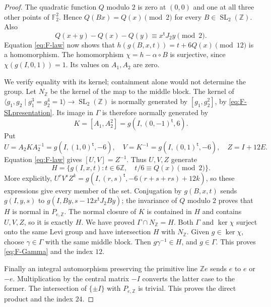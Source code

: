\begin{proof}
The quadratic function $Q$ modulo $2$ is zero at $(0,0)$ and one at all
three other points of $\mathbb F_2^2$.  Hence $Q(Bx)=Q(x)\pmod2$ for every
$B\in\operatorname{SL}_2(\mathbb Z)$.  Also
\[
 Q(x+y)-Q(x)-Q(y)\equiv x^{\mathsf t}J_2y\pmod2.
\]
Equation \eqref{eq:F-law} now shows that
$h(g(B,x,t))=t+6Q(x)\pmod{12}$ is a homomorphism.
The homomorphism $\chi=h-\alpha\circ B$ is surjective, since
$\chi(g(I,0,1))=1$.  Its values on $A_1,A_2$ are zero.

We verify equality with its kernel; containment alone would not determine
the group.  Let $N_{\mathbb Z}$ be the kernel of the map to the middle
block.  The kernel of
$\langle g_1,g_2\mid g_1^3=g_2^4=1\rangle\to
\operatorname{SL}_2(\mathbb Z)$ is normally generated by
$[g_1,g_2^2]$, by \eqref{eq:F-SLpresentation}.  Its image in $\Gamma$ is
therefore normally generated by
\[
 K=[A_1,A_2^2]=g(I,(0,-1)^{\mathsf t},6).
\]
Put
\[
 U=A_2KA_2^{-1}=g(I,(1,0)^{\mathsf t},-6),\quad
 V=K^{-1}=g(I,(0,1)^{\mathsf t},-6),\quad Z=I+12E.
\]
Equation \eqref{eq:F-law} gives $[U,V]=Z^{-1}$.  Thus $U,V,Z$ generate
\begin{equation}\label{eq:F-H}
 H=\{g(I,x,t):t\in6\mathbb Z,\quad t/6\equiv Q(x)\pmod2\}.
\end{equation}
More explicitly,
$U^rV^sZ^k=g(I,(r,s)^{\mathsf t},-6(r+s+rs)+12k)$, so these expressions
give every member of the set.  Conjugation by $g(B,x,t)$ sends
$g(I,y,s)$ to $g(I,By,s-12x^{\mathsf t}J_2By)$; the invariance of $Q$
modulo $2$ proves that $H$ is normal in $P_{e,\mathbb Z}$.  The normal
closure of $K$ is contained in $H$ and contains $U,V,Z$, so it is exactly
$H$.  We have proved $\Gamma\cap N_{\mathbb Z}=H$.  Both $\Gamma$ and
$\ker\chi$ surject onto the same Levi group and have intersection $H$
with $N_{\mathbb Z}$.  Given $g\in\ker\chi$, choose $\gamma\in\Gamma$
with the same middle block.  Then $g\gamma^{-1}\in H$, and $g\in\Gamma$.
This proves \eqref{eq:F-Gamma} and the index $12$.

Finally an integral automorphism preserving the primitive line
$\mathbb Ze$ sends $e$ to $e$ or $-e$.  Multiplication by the central
matrix $-I$ converts the latter case to the former.  The intersection of
$\{\pm I\}$ with $P_{e,\mathbb Z}$ is trivial.  This proves the direct
product and the index $24$.
\end{proof}

